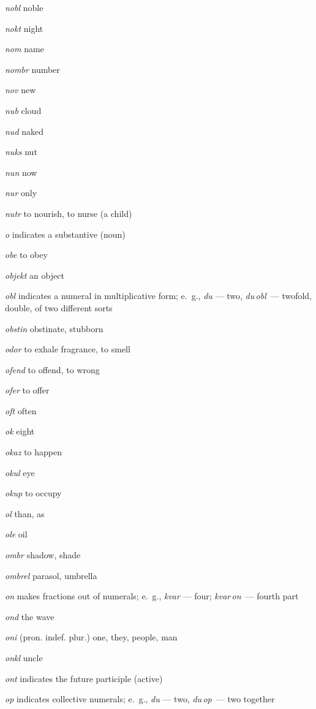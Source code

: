 \begin{landscape}
\begin{multicols}{5}
\begin{outdent}{1em}
\emph{nobl}  noble

\emph{nokt}  night

\emph{nom}  name

\emph{nombr}  number

\emph{nov}  new

\emph{nub}  cloud

\emph{nud}  naked

\emph{nuks}  nut

\emph{nun}  now

\emph{nur}  only

\emph{nutr}  to nourish, to nurse (a child)
\end{outdent}


\begin{outdent}{1em}
\emph{o } indicates a substantive (noun)

\emph{obe}  to obey

\emph{objekt}  an object

\emph{obl}  indicates a numeral in multiplicative form; e.~g., \emph{du} — two, \emph{du\,obl\,} — twofold, double, of two different sorts

\emph{obstin } obstinate, stubborn

\emph{odor}  to exhale fragrance, to smell

\emph{ofend}  to offend, to wrong

\emph{ofer}  to offer

\emph{oft } often

\emph{ok } eight

\emph{okaz}  to happen

\emph{okul}  eye

\emph{okup}  to occupy

\emph{ol}  than, as

\emph{ole}  oil

\emph{ombr}  shadow, shade

\emph{ombrel}  parasol, umbrella

\emph{on } makes fractions out of numerals; e.~g., \emph{kvar} — four; \emph{kvar\,on\,} — fourth part

\emph{ond}  the wave

\emph{oni}  (pron. indef. plur.) one, they, people, man

\emph{onkl} uncle

\emph{ont} indicates the future participle (active)

\emph{op} indicates collective numerals; e.~g., \emph{du} — two, \emph{du\,op\,} — two together


\end{outdent}
\end{multicols}
\end{landscape}
